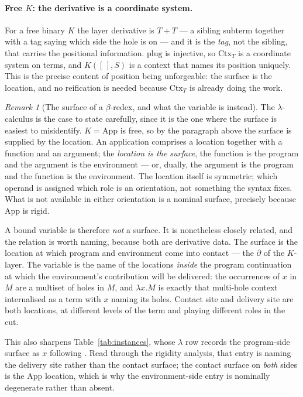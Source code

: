 \documentclass[11pt,a4paper]{article}
\theoremstyle{definition}
\theoremstyle{plain}
\theoremstyle{remark}
\newtheorem{remark}[definition]{Remark}
\newcommand{\Ctx}{\mathrm{Ctx}}
\begin{document}
\paragraph{Free $K$: the derivative is a coordinate system.}
For a free binary $K$ the layer derivative is $T + T$ --- a sibling subterm together
with a tag saying which side the hole is on --- and it is the \emph{tag}, not the
sibling, that carries the positional information. $\mathrm{plug}$ is injective, so
$\Ctx_T$ is a coordinate system on terms, and $K([\,],S)$ is a context that names its
position uniquely. This is the precise content of position being unforgeable: the
surface is the location, and no reification is needed because $\Ctx_T$ is already
doing the work.

\begin{remark}[The surface of a $\beta$-redex, and what the variable is instead]
\label{rem:lambdasurface}
The $\lambda$-calculus is the case to state carefully, since it is the one where the
surface is easiest to misidentify. $K = \mathrm{App}$ is free, so by the paragraph
above the surface is supplied by the location. An application comprises a location
together with a function and an argument; the \emph{location is the surface}, the
function is the program and the argument is the environment --- or, dually, the
argument is the program and the function is the environment. The location itself is
symmetric; which operand is assigned which role is an orientation, not something the
syntax fixes. What is not available in either orientation is a nominal surface,
precisely because $\mathrm{App}$ is rigid.

A bound variable is therefore \emph{not} a surface. It is nonetheless closely
related, and the relation is worth naming, because both are derivative data. The
surface is the location at which program and environment come into contact --- the
$\partial$ of the $K$-layer. The variable is the name of the locations \emph{inside}
the program continuation at which the environment's contribution will be delivered:
the occurrences of $x$ in $M$ are a multiset of holes in $M$, and $\lambda x.M$ is
exactly that multi-hole context internalised as a term with $x$ naming its holes.
Contact site and delivery site are both locations, at different levels of the term
and playing different roles in the cut.

This also sharpens Table~\ref{tab:instances}, whose $\lambda$ row records the
program-side surface as $x$ following \cite[Tab.~1]{cost}. Read through the rigidity
analysis, that entry is naming the delivery site rather than the contact surface; the
contact surface on \emph{both} sides is the $\mathrm{App}$ location, which is why the
environment-side entry is nominally degenerate rather than absent.
\end{remark}
\end{document}
